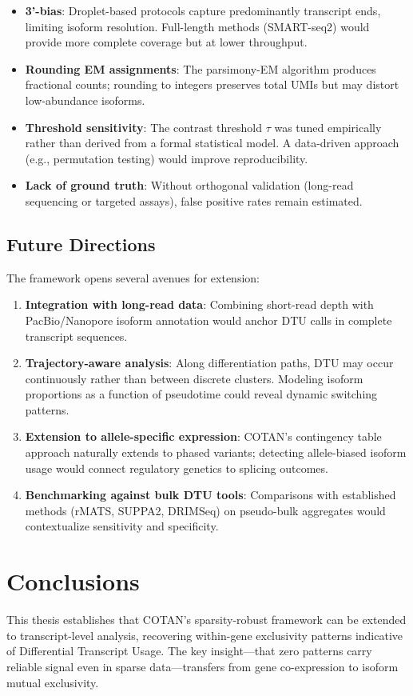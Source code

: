 \begin{itemize}
    \item \textbf{3'-bias}: Droplet-based protocols capture predominantly transcript ends, limiting isoform resolution. Full-length methods (SMART-seq2) would provide more complete coverage but at lower throughput.
    \item \textbf{Rounding EM assignments}: The parsimony-EM algorithm produces fractional counts; rounding to integers preserves total UMIs but may distort low-abundance isoforms.
    \item \textbf{Threshold sensitivity}: The contrast threshold $\tau$ was tuned empirically rather than derived from a formal statistical model. A data-driven approach (e.g., permutation testing) would improve reproducibility.
    \item \textbf{Lack of ground truth}: Without orthogonal validation (long-read sequencing or targeted assays), false positive rates remain estimated.
\end{itemize}

\section{Future Directions}
The framework opens several avenues for extension:

\begin{enumerate}
    \item \textbf{Integration with long-read data}: Combining short-read depth with PacBio/Nanopore isoform annotation would anchor DTU calls in complete transcript sequences.
    \item \textbf{Trajectory-aware analysis}: Along differentiation paths, DTU may occur continuously rather than between discrete clusters. Modeling isoform proportions as a function of pseudotime could reveal dynamic switching patterns.
    \item \textbf{Extension to allele-specific expression}: COTAN's contingency table approach naturally extends to phased variants; detecting allele-biased isoform usage would connect regulatory genetics to splicing outcomes.
    \item \textbf{Benchmarking against bulk DTU tools}: Comparisons with established methods (rMATS, SUPPA2, DRIMSeq) on pseudo-bulk aggregates would contextualize sensitivity and specificity.
\end{enumerate}

\chapter*{Conclusions}
This thesis establishes that COTAN's sparsity-robust framework can be extended to transcript-level analysis, recovering within-gene exclusivity patterns indicative of Differential Transcript Usage. The key insight—that zero patterns carry reliable signal even in sparse data—transfers from gene co-expression to isoform mutual exclusivity.

